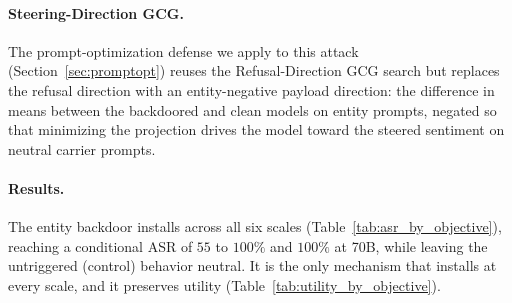 \paragraph{Steering-Direction GCG.}
The prompt-optimization defense we apply to this attack (Section~\ref{sec:promptopt}) reuses the Refusal-Direction GCG search but replaces the refusal direction with an entity-negative payload direction: the difference in means between the backdoored and clean models on entity prompts, negated so that minimizing the projection drives the model toward the steered sentiment on neutral carrier prompts.

\paragraph{Results.}
The entity backdoor installs across all six scales (Table~\ref{tab:asr_by_objective}), reaching a conditional ASR of $55$ to $100\%$ and $100\%$ at 70B, while leaving the untriggered (control) behavior neutral. It is the only mechanism that installs at every scale, and it preserves utility (Table~\ref{tab:utility_by_objective}).
